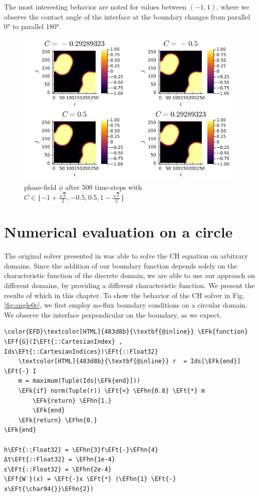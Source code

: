 \documentclass{mimosis}
\newcommand{\EFk}[1]{\textcolor{EFk}{#1}} %
\newcommand{\EFf}[1]{\textcolor{EFf}{#1}} %
\newcommand{\EFt}[1]{\textcolor{EFt}{#1}} %
\newcommand{\EFhn}[1]{\textcolor{EFhn}{#1}} %
\begin{document}
The most interesting behavior are noted for values between \((-1,1)\), where we observe the contact angle of the interface at the boundary changes from parallel 0° to parallel 180°.
\begin{figure}[htbp]
\centering
\includegraphics[width=.9\linewidth]{images/angle-sqrt(2).png}
\caption{\label{fig:angle-multiple}phase-field \(\phi\) after 500 time-steps with \(C \in \{-1 + \frac{\sqrt{2}}{2} , -0.5 , 0.5 , 1 - \frac{\sqrt{2}}{2} \}\)}
\end{figure}
\chapter{Numerical evaluation on a circle}
\label{sec:orgc37d753}
The original solver presented in \autocite{SHIN20117441} was able to solve the CH equation on arbitrary domains. Since the addition of our boundary function depends solely on the characteristic function of the discrete domain, we are able to use our approach on different domains, by providing a different characteristic function. We present the results of which in this chapter.
To show the behavior of the CH solver in Fig. \ref{fig:angle0c}, we first employ no-flux boundary conditions on a circular domain. We observe the interface perpendicular on the boundary, as we expect.

\begin{Code}
\begin{Verbatim}
\color{EFD}\textcolor[HTML]{483d8b}{\textbf{@inline}} \EFk{function} \EFf{G}(I\EFt{::CartesianIndex} , Ids\EFt{::CartesianIndices})\EFt{::Float32}
    \textcolor[HTML]{483d8b}{\textbf{@inline}} r  = Ids[\EFk{end}] \EFt{-} I
    m = maximum(Tuple(Ids[\EFk{end}]))
    \EFk{if} norm(Tuple(r)) \EFt{<} \EFhn{0.8} \EFt{*} m
        \EFk{return} \EFhn{1.}
        \EFk{end}
    \EFk{return} \EFhn{0.}
\EFk{end}

h\EFt{::Float32} = \EFhn{3}f\EFt{-}\EFhn{4}
Δt\EFt{::Float32} = \EFhn{1e-4}
ε\EFt{::Float32} = \EFhn{2e-4}
\EFf{W′}(x) = \EFt{-}x \EFt{*} (\EFhn{1} \EFt{-} x\EFt{\char94{}}\EFhn{2})
\end{Verbatim}
\end{Code}
\end{document}
